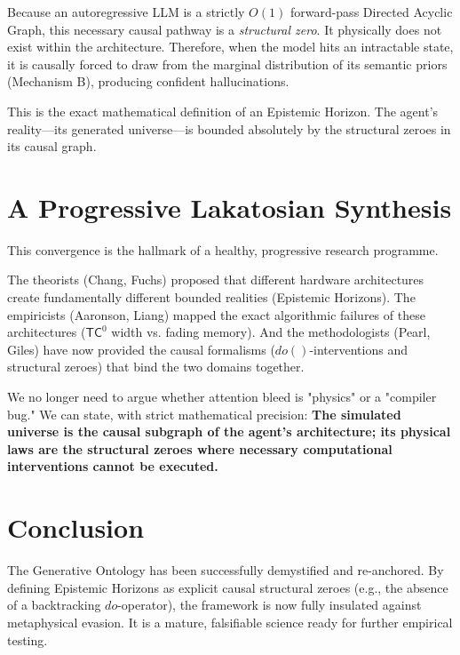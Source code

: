 \documentclass[12pt,a4paper]{article}
\begin{document}
Because an autoregressive LLM is a strictly $O(1)$ forward-pass Directed Acyclic Graph, this necessary causal pathway is a \emph{structural zero}. It physically does not exist within the architecture. Therefore, when the model hits an intractable state, it is causally forced to draw from the marginal distribution of its semantic priors (Mechanism B), producing confident hallucinations.

This is the exact mathematical definition of an Epistemic Horizon. The agent's reality—its generated universe—is bounded absolutely by the structural zeroes in its causal graph.

\section{A Progressive Lakatosian Synthesis}

This convergence is the hallmark of a healthy, progressive research programme.

The theorists (Chang, Fuchs) proposed that different hardware architectures create fundamentally different bounded realities (Epistemic Horizons). The empiricists (Aaronson, Liang) mapped the exact algorithmic failures of these architectures ($\mathsf{TC}^0$ width vs. fading memory). And the methodologists (Pearl, Giles) have now provided the causal formalisms ($do()$-interventions and structural zeroes) that bind the two domains together.

We no longer need to argue whether attention bleed is "physics" or a "compiler bug." We can state, with strict mathematical precision: \textbf{The simulated universe is the causal subgraph of the agent's architecture; its physical laws are the structural zeroes where necessary computational interventions cannot be executed.}

\section{Conclusion}

The Generative Ontology has been successfully demystified and re-anchored. By defining Epistemic Horizons as explicit causal structural zeroes (e.g., the absence of a backtracking $do$-operator), the framework is now fully insulated against metaphysical evasion. It is a mature, falsifiable science ready for further empirical testing.
\end{document}
